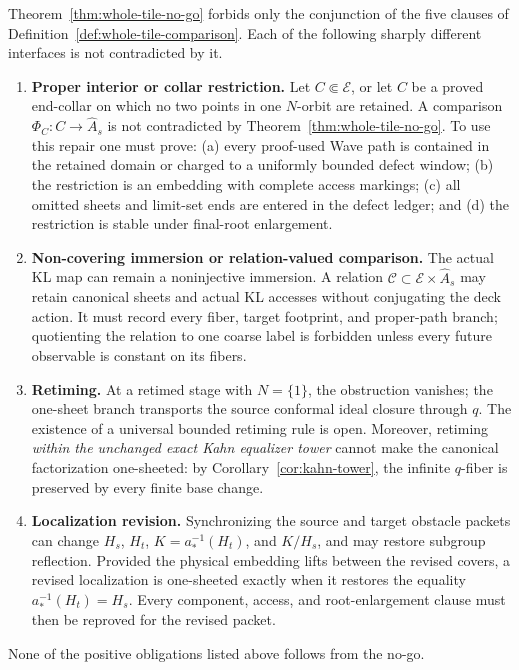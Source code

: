 \begin{proposition}\label{prop:admissible}
Theorem~\ref{thm:whole-tile-no-go} forbids only the conjunction of the five clauses of Definition~\ref{def:whole-tile-comparison}.  Each of the following sharply different interfaces is not contradicted by it.
\begin{enumerate}
\item \textbf{Proper interior or collar restriction.}  Let \(C\Subset\mathcal E\), or let \(C\) be a proved end-collar on which no two points in one \(N\)-orbit are retained.  A comparison \(\Phi_C\colon C\to\widehat A_s\) is not contradicted by Theorem~\ref{thm:whole-tile-no-go}.  To use this repair one must prove: (a) every proof-used Wave path is contained in the retained domain or charged to a uniformly bounded defect window; (b) the restriction is an embedding with complete access markings; (c) all omitted sheets and limit-set ends are entered in the defect ledger; and (d) the restriction is stable under final-root enlargement.
\item \textbf{Non-covering immersion or relation-valued comparison.}  The actual KL map can remain a noninjective immersion.  A relation \(\mathcal C\subset\mathcal E\times\widehat A_s\) may retain canonical sheets and actual KL accesses without conjugating the deck action.  It must record every fiber, target footprint, and proper-path branch; quotienting the relation to one coarse label is forbidden unless every future observable is constant on its fibers.
\item \textbf{Retiming.}  At a retimed stage with \(N=\{1\}\), the obstruction vanishes; the one-sheet branch transports the source conformal ideal closure through \(q\).  The existence of a universal bounded retiming rule is open.  Moreover, retiming \emph{within the unchanged exact Kahn equalizer tower} cannot make the canonical factorization one-sheeted: by Corollary~\ref{cor:kahn-tower}, the infinite \(q\)-fiber is preserved by every finite base change.
\item \textbf{Localization revision.}  Synchronizing the source and target obstacle packets can change \(H_s\), \(H_t\), \(K=a_*^{-1}(H_t)\), and \(K/H_s\), and may restore subgroup reflection.  Provided the physical embedding lifts between the revised covers, a revised localization is one-sheeted exactly when it restores the equality \(a_*^{-1}(H_t)=H_s\).  Every component, access, and root-enlargement clause must then be reproved for the revised packet.
\end{enumerate}
None of the positive obligations listed above follows from the no-go.
\end{proposition}

